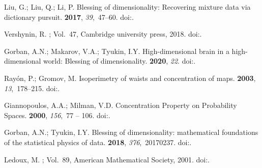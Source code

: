 \documentclass[entropy,article,submit,moreauthors,pdftex]{Definitions/mdpi}
\begin{document}
\begin{thebibliography}{-------}
Liu, G.; Liu, Q.; Li, P.
\newblock Blessing of dimensionality: Recovering mixture data via dictionary
  pursuit.
 {\bf 2017}, {\em 39},~47--60.
\newblock
  doi:{\href{https://doi.org/10.1109/tpami.2016.2539946}{}}.

Vershynin, R.
; Vol.~47, Cambridge university press,  2018.
\newblock
  doi:{\href{https://doi.org/10.1017/9781108231596}{}}.

Gorban, A.N.; Makarov, V.A.; Tyukin, I.Y.
\newblock High-dimensional brain in a high-dimensional world: Blessing of
  dimensionality.
 {\bf 2020}, {\em 22}.
\newblock
  doi:{\href{https://doi.org/10.3390/e22010082}{}}.

Ray{\'o}n, P.; Gromov, M.
\newblock Isoperimetry of waists and concentration of maps.
 {\bf 2003}, {\em 13},~178--215.
\newblock
  doi:{\href{https://doi.org/10.1007/s00039--009-0703-1}{}}.

Giannopoulos, A.A.; Milman, V.D.
\newblock Concentration Property on Probability Spaces.
 {\bf 2000}, {\em 156},~77 -- 106.
\newblock
  doi:{\href{https://doi.org/10.1006/aima.2000.1949}{}}.

Gorban, A.N.; Tyukin, I.Y.
\newblock Blessing of dimensionality: mathematical foundations of the
  statistical physics of data.
 {\bf 2018}, {\em 376},~20170237.
\newblock
  doi:{\href{https://doi.org/10.1098/rsta.2017.0237}{}}.

Ledoux, M.
; Vol.~89, American
  Mathematical Society,  2001.
\newblock
  doi:{\href{https://doi.org/10.1090/surv/089}{}}.


\end{thebibliography}
\end{document}
